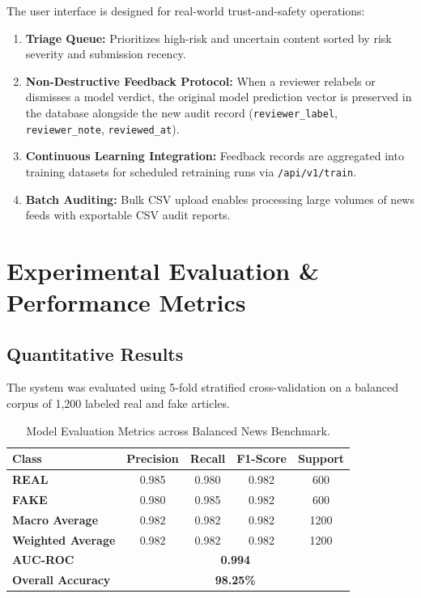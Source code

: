 \documentclass[11pt,a4paper]{article}
\begin{document}
The user interface is designed for real-world trust-and-safety operations:
\begin{enumerate}
    \item \textbf{Triage Queue:} Prioritizes high-risk and uncertain content sorted by risk severity and submission recency.
    \item \textbf{Non-Destructive Feedback Protocol:} When a reviewer relabels or dismisses a model verdict, the original model prediction vector is preserved in the database alongside the new audit record (\texttt{reviewer\_label}, \texttt{reviewer\_note}, \texttt{reviewed\_at}).
    \item \textbf{Continuous Learning Integration:} Feedback records are aggregated into training datasets for scheduled retraining runs via \texttt{/api/v1/train}.
    \item \textbf{Batch Auditing:} Bulk CSV upload enables processing large volumes of news feeds with exportable CSV audit reports.
\end{enumerate}

\section{Experimental Evaluation \& Performance Metrics}

\subsection{Quantitative Results}
The system was evaluated using 5-fold stratified cross-validation on a balanced corpus of 1,200 labeled real and fake articles.

\begin{table}[htbp]
\centering
\begin{tabular}{lcccc}
\toprule
\textbf{Class} & \textbf{Precision} & \textbf{Recall} & \textbf{F1-Score} & \textbf{Support} \\
\midrule
\textbf{REAL} & 0.985 & 0.980 & 0.982 & 600 \\
\textbf{FAKE} & 0.980 & 0.985 & 0.982 & 600 \\
\midrule
\textbf{Macro Average} & 0.982 & 0.982 & 0.982 & 1200 \\
\textbf{Weighted Average} & 0.982 & 0.982 & 0.982 & 1200 \\
\textbf{AUC-ROC} & \multicolumn{4}{c}{\textbf{0.994}} \\
\textbf{Overall Accuracy} & \multicolumn{4}{c}{\textbf{98.25\%}} \\
\bottomrule
\end{tabular}
\caption{Model Evaluation Metrics across Balanced News Benchmark.}
\label{tab:metrics}
\end{table}
\end{document}
